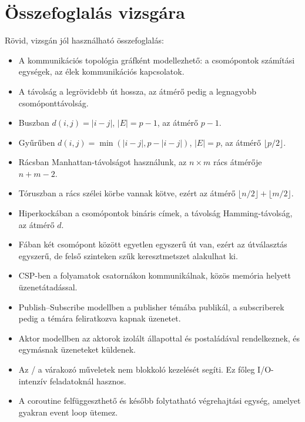 \section{Összefoglalás vizsgára}

Rövid, vizsgán jól használható összefoglalás:

\begin{itemize}
  \item A kommunikációs topológia gráfként modellezhető: a csomópontok számítási egységek, az élek kommunikációs kapcsolatok.
  \item A távolság a legrövidebb út hossza, az átmérő pedig a legnagyobb csomóponttávolság.
  \item Buszban $d(i,j)=|i-j|$, $|E|=p-1$, az átmérő $p-1$.
  \item Gyűrűben $d(i,j)=\min(|i-j|,p-|i-j|)$, $|E|=p$, az átmérő $\lfloor p/2\rfloor$.
  \item Rácsban Manhattan-távolságot használunk, az $n\times m$ rács átmérője $n+m-2$.
  \item Tóruszban a rács szélei körbe vannak kötve, ezért az átmérő $\lfloor n/2\rfloor+\lfloor m/2\rfloor$.
  \item Hiperkockában a csomópontok bináris címek, a távolság Hamming-távolság, az átmérő $d$.
  \item Fában két csomópont között egyetlen egyszerű út van, ezért az útválasztás egyszerű, de felső szinteken szűk keresztmetszet alakulhat ki.
  \item CSP-ben a folyamatok csatornákon kommunikálnak, közös memória helyett üzenetátadással.
  \item Publish--Subscribe modellben a publisher témába publikál, a subscriberek pedig a témára feliratkozva kapnak üzenetet.
  \item Aktor modellben az aktorok izolált állapottal és postaládával rendelkeznek, és egymásnak üzeneteket küldenek.
  \item Az / a várakozó műveletek nem blokkoló kezelését segíti. Ez főleg I/O-intenzív feladatoknál hasznos.
  \item A coroutine felfüggeszthető és később folytatható végrehajtási egység, amelyet gyakran event loop ütemez.
\end{itemize}

